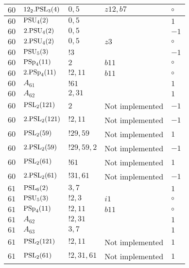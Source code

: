 \documentclass[a4paper, 11pt]{article}
\begin{document}
\begin{longtable}{lllll}
        $ 60 $ & $ 12_2.{\rm PSL}_{3}(4) $ & $ 0,5 $ & $ z12, b7 $ &  $\circ$ \\ \hline
        $ 60 $ & $ {\rm PSU}_{4}(2) $ & $ 0,5 $ & $ ~ $ & $ 1$ \\ \hline
        $ 60 $ & $ 2.{\rm PSU}_{4}(2) $ & $ 0,5 $ & $ ~ $ & $ -1$ \\ \hline
        $ 60 $ & $ 2.{\rm PSU}_{4}(2) $ & $ 0,5 $ & $ z3 $ &  $\circ$ \\ \hline
        $ 60 $ & $ {\rm PSU}_{5}(3) $ & $ ! 3 $ & $ ~ $ & $ -1$ \\ \hline
        $ 60 $ & $ {\rm PSp}_{4}(11) $ & $ 2 $ & $ b11 $ &  $\circ$ \\ \hline
        $ 60 $ & $ 2.{\rm PSp}_{4}(11) $ & $ ! 2,11 $ & $ b11 $ &  $\circ$ \\ \hline
        $ 60 $ & $ A_{61} $ & $ !61 $ & $ ~ $ & $ 1$ \\ \hline
        $ 60 $ & $ A_{62} $ & $ 2, 31 $ & $ ~ $ & $ 1$ \\ \hline
        $ 60 $ & $ {\rm PSL}_{2}(121) $ & $ 2 $ &  Not implemented & $ -1$ \\ \hline
        $ 60 $ & $ 2.{\rm PSL}_{2}(121) $ & $ !2, 11 $ &  Not implemented & $ -1$ \\ \hline
        $ 60 $ & $ {\rm PSL}_{2}(59) $ & $ !29, 59 $ &  Not implemented & $ 1$ \\ \hline
        $ 60 $ & $ 2.{\rm PSL}_{2}(59) $ & $ !29, 59, 2 $ &  Not implemented & $ -1$ \\ \hline
        $ 60 $ & $ {\rm PSL}_{2}(61) $ & $ !61 $ &  Not implemented & $ 1$ \\ \hline
        $ 60 $ & $ 2.{\rm PSL}_{2}(61) $ & $ !31, 61 $ &  Not implemented & $ -1$ \\ \hline
        $ 61 $ & $ {\rm PSL}_{6}(2) $ & $ 3,7 $ & $ ~ $ & $ 1$ \\ \hline
        $ 61 $ & $ {\rm PSU}_{5}(3) $ & $ ! 2,3 $ & $ i1 $ &  $\circ$ \\ \hline
        $ 61 $ & $ {\rm PSp}_{4}(11) $ & $ ! 2,11 $ & $ b11 $ &  $\circ$ \\ \hline
        $ 61 $ & $ A_{62} $ & $ !2, 31 $ & $ ~ $ & $ 1$ \\ \hline
        $ 61 $ & $ A_{63} $ & $ 3, 7 $ & $ ~ $ & $ 1$ \\ \hline
        $ 61 $ & $ {\rm PSL}_{2}(121) $ & $ !2, 11 $ &  Not implemented & $ 1$ \\ \hline
        $ 61 $ & $ {\rm PSL}_{2}(61) $ & $ !2, 31, 61 $ &  Not implemented & $ 1$ \\ \hline

\end{longtable}
\end{document}
